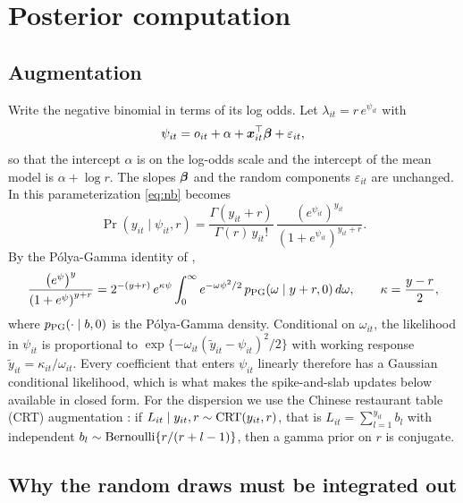 \section{Posterior computation}\label{sec:computation}

\subsection{Augmentation}

Write the negative binomial in terms of its log odds. Let $\lambda_{it}=r\,e^{\psi_{it}}$ with
\begin{equation}\label{eq:psi}
\psi_{it}=o_{it}+\alpha+\bm{x}_{it}^\top\bm{\beta}+\varepsilon_{it},
\end{equation}
so that the intercept $\alpha$ is on the log-odds scale and the intercept of the mean model is $\alpha+\log r$. The slopes $\bm{\beta}$ and the random components $\varepsilon_{it}$ are unchanged. In this parameterization \eqref{eq:nb} becomes
\begin{equation}\label{eq:nb-logit}
\Pr(y_{it}\mid\psi_{it},r)=\frac{\Gamma(y_{it}+r)}{\Gamma(r)\,y_{it}!}\,\frac{\left(e^{\psi_{it}}\right)^{y_{it}}}{\left(1+e^{\psi_{it}}\right)^{y_{it}+r}} .
\end{equation}
By the P\'olya-Gamma identity of \citet{polson2013bayesian},
\begin{equation}\label{eq:pg}
\frac{\left(e^{\psi}\right)^{y}}{\left(1+e^{\psi}\right)^{y+r}}
=2^{-(y+r)}\,e^{\kappa\psi}\int_0^\infty e^{-\omega\psi^2/2}\,p_{\mathrm{PG}}(\omega\mid y+r,0)\,d\omega,
\qquad \kappa=\frac{y-r}{2},
\end{equation}
where $p_{\mathrm{PG}}(\cdot\mid b,0)$ is the P\'olya-Gamma density. Conditional on $\omega_{it}$, the likelihood in $\psi_{it}$ is proportional to $\exp\{-\omega_{it}(\tilde y_{it}-\psi_{it})^2/2\}$ with working response $\tilde y_{it}=\kappa_{it}/\omega_{it}$. Every coefficient that enters $\psi_{it}$ linearly therefore has a Gaussian conditional likelihood, which is what makes the spike-and-slab updates below available in closed form. For the dispersion we use the Chinese restaurant table (CRT) augmentation \citep{zhou2012lognormal, zhou2015negative}: if $L_{it}\mid y_{it},r\sim\mathrm{CRT}(y_{it},r)$, that is $L_{it}=\sum_{l=1}^{y_{it}}b_l$ with independent $b_l\sim\mathrm{Bernoulli}\{r/(r+l-1)\}$, then a gamma prior on $r$ is conjugate.

\subsection{Why the random draws must be integrated out}\label{sec:collapse}

